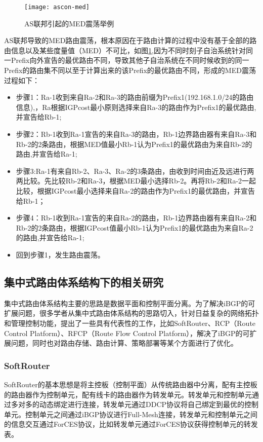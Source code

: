 \begin{figure}
  \centering
  \texttt{[image: ascon-med]}
  \caption{AS联邦引起的MED震荡举例}
  \label{fig:ascon-med}
\end{figure}

AS联邦导致的MED路由震荡\cite{rfc3345}，根本原因在于路由计算的过程中没有基于全部的路由信息以及某些度量值（MED）不可比，如图\ref{fig:ascon-med},因为不同时刻子自治系统针对同一Prefix向外宣告的最优路由不同，导致其他子自治系统在不同时候收到的同一Prefix的路由集不同以至于计算出来的该Prefix的最优路由不同，形成的MED震荡过程如下：


\begin{itemize}
  \item 步骤1：Ra-1收到来自Ra-2和Ra-3的路由前缀为Prefix1(192.168.1.0/24的路由信息),，Ra根据IGPcost最小原则选择来自Ra-3的路由作为Prefix1的最优路由,并宣告给Rb-1;
  \item 步骤2：Rb-1收到Ra-1宣告的来自Ra-3的路由，Rb-1边界路由器有来自Ra-3和Rb-2的2条路由，根据MED值最小Rb-1认为Prefix1的最优路由为来自Rb-2的路由,并宣告给Ra-1;
  \item 步骤3:Ra-1有来自Rb-2、Ra-3、Ra-2的3条路由，由收到时间由近及远进行两两比较。先比较Rb-2和Ra-3，根据MED最小选择Rb-2。再将Rb-2和Ra-2一起比较，根据IGPcost最小选择来自Ra-2的路由作为Prefix1的最优路由，并宣告给Rb-1；
  \item 步骤4：Rb-1收到Ra-1宣告的来自Ra-2的路由，Rb-1边界路由器有来自Ra-2和Rb-2的2条路由，根据IGPcost值最小Rb-1认为Prefix1的最优路由为来自Ra-2的路由,并宣告给Ra-1;
  \item 回到步骤1，发生路由震荡。
\end{itemize}

\subsection{集中式路由体系结构下的相关研究}

集中式路由体系结构主要的思路是数据平面和控制平面分离。为了解决iBGP的可扩展问题，很多学者从集中式路由体系结构的思路切入，针对日益复杂的网络拓扑和管理控制功能，提出了一些具有代表性的工作，比如SoftRouter、RCP（Route Control Platform）、RFCP（Route Flow Control Platform），解决了iBGP的可扩展问题，同时也对路由存储、路由计算、策略部署等某个方面进行了优化。

\subsubsection{SoftRouter\cite{lakshman2004}}
SoftRouter的基本思想是将主控板（控制平面）从传统路由器中分离，配有主控板的路由器作为控制单元，配有线卡的路由器作为转发单元。转发单元和控制单元通过多对多的动态绑定进行连接，转发单元通过DDCP协议将自己绑定到最优的控制单元。控制单元之间通过iBGP协议进行Full-Mesh连接，转发单元和控制单元之间的信息交互通过ForCES\cite{rfc3746}协议，比如转发单元通过ForCES协议获得控制单元的转发表。

